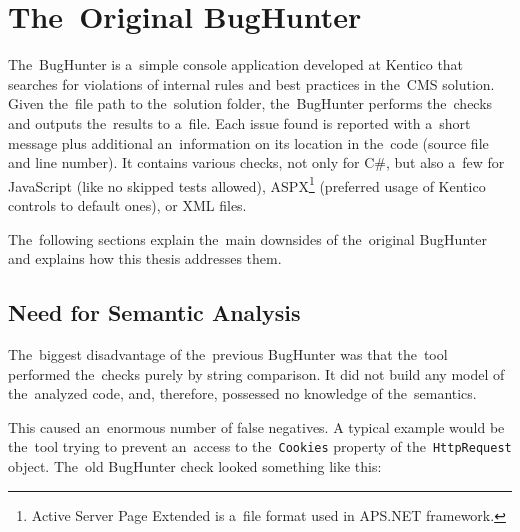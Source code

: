 \documentclass[
  digital, %
  table,   %
  lof,     %
  lot,     %
  oneside,
]{fithesis3}
\begin{document}



\section{The~Original BugHunter}
The~BugHunter is a~simple console application developed at Kentico that searches for violations of internal rules and best practices in the~CMS solution. Given the~file path to the~solution folder, the~BugHunter performs the~checks and outputs the~results to a~file. Each issue found is reported with a~short message plus additional an~information on its location in the~code (source file and line number). It contains various checks, not only for C\#, but also a~few for JavaScript (like no skipped tests allowed), ASPX\footnote{Active Server Page Extended is a~file format used in APS.NET framework.} (preferred usage of Kentico controls to default ones), or XML files.

The~following sections explain the~main downsides of the~original BugHunter and explains how this thesis addresses them.

\subsection{Need for Semantic Analysis}
The~biggest disadvantage of the~previous BugHunter was that the~tool performed the~checks purely by string comparison. It did not build any model of the~analyzed code, and, therefore, possessed no knowledge of the~semantics. 

This caused an~enormous number of false negatives. A typical example would be the~tool trying to prevent an~access to the~\texttt{Cookies} property of the~\texttt{HttpRequest} object. The~old BugHunter check looked something like this:
\end{document}
